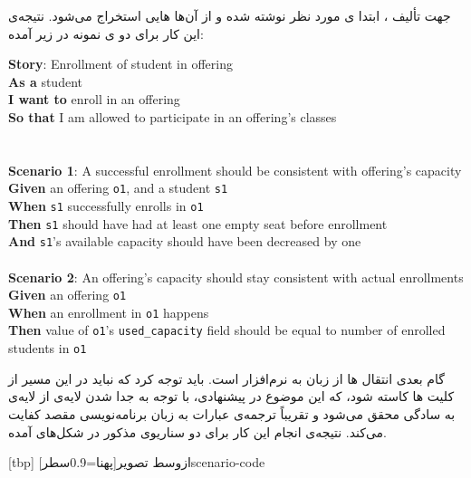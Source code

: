 
جهت تألیف ، ابتدا ی مورد نظر نوشته شده و از آن‌ها ‌هایی استخراج می‌شود. نتیجه‌ی این کار برای دو ی نمونه در زیر آمده:

\begin{minipage}{\textwidth}
\latin
\textbf{Story}: Enrollment of student in offering\\
\textbf{As a} student\\
\textbf{I want to} enroll in an offering\\
\textbf{So that} I am allowed to participate in an offering's classes\\
\\
\\
\textbf{Scenario 1}: A successful enrollment should be consistent with offering's capacity
\textbf{Given}
	an offering \texttt{o1}, and a student \texttt{s1}\\
\textbf{When}
	\texttt{s1} successfully enrolls in \texttt{o1}\\
\textbf{Then}
	\texttt{s1} should have had at least one empty seat before enrollment\\
\textbf{And}
	\texttt{s1}'s available capacity should have been decreased by one\\
\\
\textbf{Scenario 2}: An offering's capacity should stay consistent with actual enrollments 
\textbf{Given}
	an offering \texttt{o1}\\
\textbf{When}
	an enrollment in \texttt{o1} happens\\
\textbf{Then}
	value of \texttt{o1}'s \texttt{used\_capacity} field should be equal to number of enrolled students in \texttt{o1}\\
\end{minipage}

گام بعدی انتقال ‌ها از زبان  به نرم‌افزار است. باید توجه کرد که نباید در این مسیر از کلیت ‌ها کاسته شود، که این موضوع در  پیشنهادی، با توجه به جدا شدن لایه‌ی  از لایه‌ی  به سادگی محقق می‌شود و تقریباً ترجمه‌ی عبارات به زبان برنامه‌نویسی مقصد کفایت می‌کند. نتیجه‌ی انجام این کار برای دو سناریوی مذکور در شکل‌های  آمده.

[tbp]
‌ازوسط
‌تصویر[پهنا=0.9‌سطر]{scenario-code}


